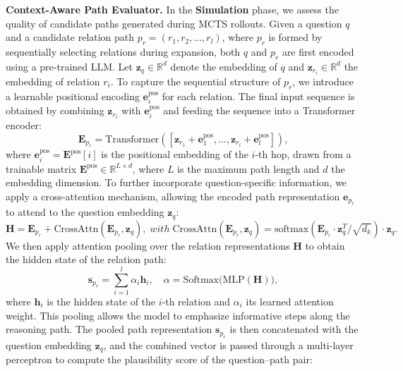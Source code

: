 \textbf{Context-Aware Path Evaluator.} 
In the \textbf{Simulation} phase, we assess the quality of candidate paths generated during MCTS rollouts. Given a question $q$ and a candidate relation path $p_r = (r_1, r_2, \ldots, r_l)$, where $p_r$ is formed by sequentially selecting relations during expansion, both $q$ and $p_r$ are first encoded using a pre-trained LLM. Let $\mathbf{z}_q \in \mathbb{R}^d$ denote the embedding of $q$ and $\mathbf{z}_{r_i} \in \mathbb{R}^d$ the embedding of relation $r_i$. To capture the sequential structure of $p_r$, we introduce a learnable positional encoding $\mathbf{e}_i^{\text{pos}}$ for each relation. The final input sequence is obtained by combining $\mathbf{z}_{r_i}$ with $\mathbf{e}_i^{\text{pos}}$ and feeding the sequence into a Transformer encoder:
\begin{equation}
\mathbf{E}_{p_r} = \text{Transformer}([\mathbf{z}_{r_1} + \mathbf{e}_1^{\text{pos}}, \ldots, \mathbf{z}_{r_l} + \mathbf{e}_l^{\text{pos}}]),
\end{equation}
where $\mathbf{e}_i^{\text{pos}} = \mathbf{E}^{\text{pos}}[i]$ is the positional embedding of the $i$-th hop, drawn from a trainable matrix $\mathbf{E}^{\text{pos}} \in \mathbb{R}^{L \times d}$, where $L$ is the maximum path length and $d$ the embedding dimension. To further incorporate question-specific information, we apply a cross-attention mechanism, allowing the encoded path representation $\mathbf{e}_{p_r}$ to attend to the question embedding $\mathbf{z}_q$:
\begin{equation}
\mathbf{H} = \mathbf{E}_{p_r} + \mathrm{CrossAttn}(\mathbf{E}_{p_r}, \mathbf{z}_q),    \;
    with\; \text{CrossAttn}(\mathbf{E}_{p_r}, \mathbf{z}_q)=\text{softmax}({\mathbf{E}_{p_r} \cdot \mathbf{z}_q^T}/{\sqrt{d_k}}) \cdot \mathbf{z}_q. 
\end{equation}
We then apply attention pooling over the relation representations $\mathbf{H}$ to obtain the hidden state of the relation path:
\begin{equation}
\mathbf{s}_{p_r} = \sum_{i=1}^l \alpha_i \textbf{h}_i, \quad \alpha = \text{Softmax}\big(\text{MLP}(\mathbf{H})\big),    
\end{equation}
where $\mathbf{h}_i$ is the hidden state of the $i$-th relation and $\alpha_i$ its learned attention weight. This pooling allows the model to emphasize informative steps along the reasoning path. The pooled path representation $\mathbf{s}_{p_r}$ is then concatenated with the question embedding $\mathbf{z}_q$, and the combined vector is passed through a multi-layer perceptron to compute the plausibility score of the question–path pair:

